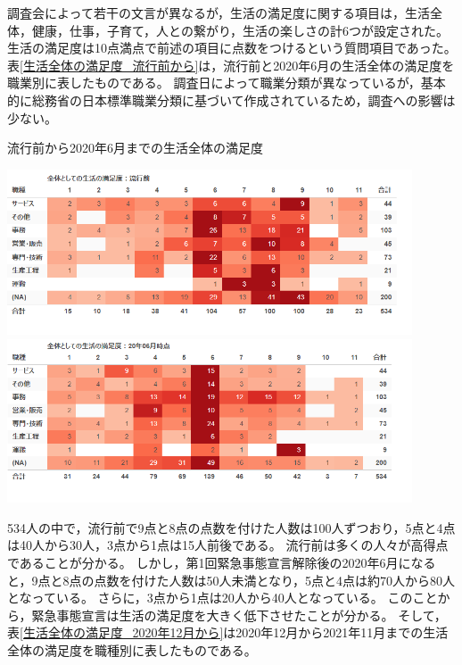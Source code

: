 \documentclass[paper={210mm,297mm},fontsize=15Q,line_length=35zw,number_of_lines=31,head_space=30mm,gutter=40mm,baselineskip=2.0zw,headfoot_verticalposition=1.5zw]{jlreq}
\begin{document}
調査会によって若干の文言が異なるが，生活の満足度に関する項目は，生活全体，健康，仕事，子育て，人との繋がり，生活の楽しさの計6つが設定された。
生活の満足度は10点満点で前述の項目に点数をつけるという質問項目であった。
表\ref{生活全体の満足度_流行前から}は，流行前と2020年6月の生活全体の満足度を職業別に表したものである。
調査日によって職業分類が異なっているが，基本的に総務省の日本標準職業分類に基づいて作成されているため，調査への影響は少ない。

\begin{table}[H]
  \centering
  \caption{流行前から2020年6月までの生活全体の満足度}%
  \includegraphics[width=120mm]{../Figure/c05s01_table_全体の生活の満足度：00-流行前.png}
  \includegraphics[width=120mm]{../Figure/c05s01_table_全体の生活の満足度：R2-06.png}
  \label{生活全体の満足度_流行前から}
\end{table}

534人の中で，流行前で9点と8点の点数を付けた人数は100人ずつおり，5点と4点は40人から30人，3点から1点は15人前後である。
流行前は多くの人々が高得点であることが分かる。
しかし，第1回緊急事態宣言解除後の2020年6月になると，9点と8点の点数を付けた人数は50人未満となり，5点と4点は約70人から80人となっている。
さらに，3点から1点は20人から40人となっている。
このことから，緊急事態宣言は生活の満足度を大きく低下させたことが分かる。
そして，表\ref{生活全体の満足度_2020年12月から}は2020年12月から2021年11月までの生活全体の満足度を職種別に表したものである。
\end{document}
